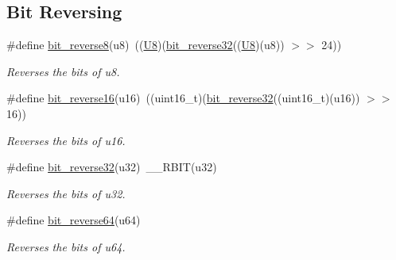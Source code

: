 \subsection*{Bit Reversing}
\begin{DoxyCompactItemize}
\item 
\#define \hyperlink{group__group__sam0__utils_gaef8832dcae9aaac78c5ebe91fc33084b}{bit\+\_\+reverse8}(u8)~((\hyperlink{group__group__sam0__utils_gaa63ef7b996d5487ce35a5a66601f3e73}{U8})(\hyperlink{group__group__sam0__utils_gaff755a5c107b5e28e5b846c5f122e69f}{bit\+\_\+reverse32}((\hyperlink{group__group__sam0__utils_gaa63ef7b996d5487ce35a5a66601f3e73}{U8})(u8)) $>$$>$ 24))
\begin{DoxyCompactList}\small\item\em Reverses the bits of {\itshape u8}. \end{DoxyCompactList}\item 
\#define \hyperlink{group__group__sam0__utils_gabab01124189eab03857671c05abfe377}{bit\+\_\+reverse16}(u16)~((uint16\+\_\+t)(\hyperlink{group__group__sam0__utils_gaff755a5c107b5e28e5b846c5f122e69f}{bit\+\_\+reverse32}((uint16\+\_\+t)(u16)) $>$$>$ 16))
\begin{DoxyCompactList}\small\item\em Reverses the bits of {\itshape u16}. \end{DoxyCompactList}\item 
\#define \hyperlink{group__group__sam0__utils_gaff755a5c107b5e28e5b846c5f122e69f}{bit\+\_\+reverse32}(u32)~\+\_\+\+\_\+\+R\+B\+I\+T(u32)
\begin{DoxyCompactList}\small\item\em Reverses the bits of {\itshape u32}. \end{DoxyCompactList}\item 
\#define \hyperlink{group__group__sam0__utils_ga7f3f2d786440776bab3f688cbd1e8030}{bit\+\_\+reverse64}(u64)
\begin{DoxyCompactList}\small\item\em Reverses the bits of {\itshape u64}. \end{DoxyCompactList}\end{DoxyCompactItemize}
